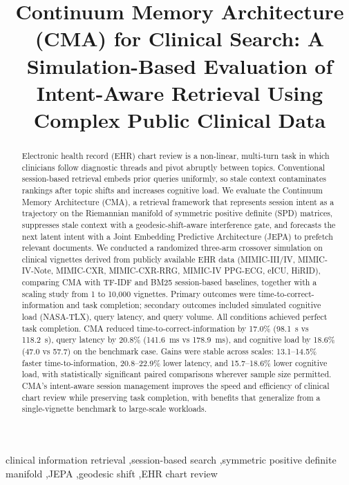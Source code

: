 \documentclass[preprint,12pt]{elsarticle}
\begin{document}
\begin{frontmatter}

\title{Continuum Memory Architecture (CMA) for Clinical Search: A Simulation-Based Evaluation of Intent-Aware Retrieval Using Complex Public Clinical Data}

\begin{abstract}
Electronic health record (EHR) chart review is a non-linear, multi-turn task in which clinicians follow diagnostic threads and pivot abruptly between topics. Conventional session-based retrieval embeds prior queries uniformly, so stale context contaminates rankings after topic shifts and increases cognitive load. We evaluate the Continuum Memory Architecture (CMA), a retrieval framework that represents session intent as a trajectory on the Riemannian manifold of symmetric positive definite (SPD) matrices, suppresses stale context with a geodesic-shift-aware interference gate, and forecasts the next latent intent with a Joint Embedding Predictive Architecture (JEPA) to prefetch relevant documents. We conducted a randomized three-arm crossover simulation on clinical vignettes derived from publicly available EHR data (MIMIC-III/IV, MIMIC-IV-Note, MIMIC-CXR, MIMIC-CXR-RRG, MIMIC-IV PPG-ECG, eICU, HiRID), comparing CMA with TF-IDF and BM25 session-based baselines, together with a scaling study from 1 to 10{,}000 vignettes. Primary outcomes were time-to-correct-information and task completion; secondary outcomes included simulated cognitive load (NASA-TLX), query latency, and query volume. All conditions achieved perfect task completion. CMA reduced time-to-correct-information by 17.0\% (98.1~s vs 118.2~s), query latency by 20.8\% (141.6~ms vs 178.9~ms), and cognitive load by 18.6\% (47.0 vs 57.7) on the benchmark case. Gains were stable across scales: 13.1--14.5\% faster time-to-information, 20.8--22.9\% lower latency, and 15.7--18.6\% lower cognitive load, with statistically significant paired comparisons wherever sample size permitted. CMA's intent-aware session management improves the speed and efficiency of clinical chart review while preserving task completion, with benefits that generalize from a single-vignette benchmark to large-scale workloads.
\end{abstract}

\begin{keyword}
clinical information retrieval \sep session-based search \sep symmetric positive definite manifold \sep JEPA \sep geodesic shift \sep EHR chart review
\end{keyword}

\end{frontmatter}
\end{document}
